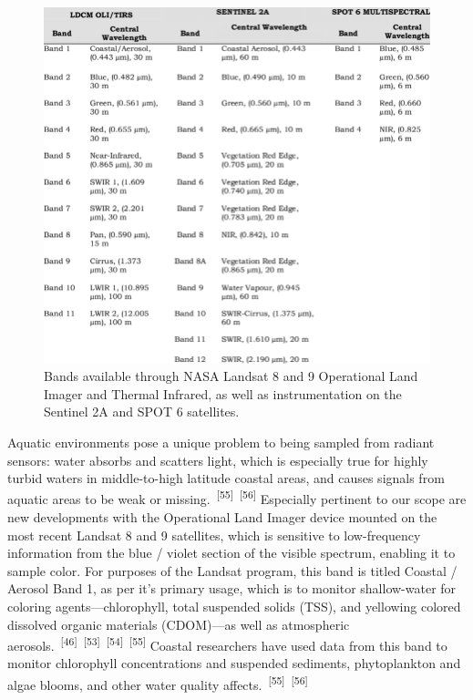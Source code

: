 \documentclass{article}
\begin{document}

\begin{figure}
    \centering
    \includegraphics[width=0.7\linewidth]{images/landsat-8-specs.png}
    \caption{Bands available through NASA Landsat 8 and 9 Operational Land Imager and Thermal Infrared, as well as instrumentation on the Sentinel 2A and SPOT 6 satellites.}
    \label{figure13}
\end{figure}


\par{Aquatic environments pose a unique problem to being sampled from radiant sensors: water absorbs and scatters light, which is especially true for highly turbid waters in middle-to-high latitude coastal areas, and causes signals from aquatic areas to be weak or missing.~\textsuperscript{[55]}~\textsuperscript{[56]} Especially pertinent to our scope are new developments with the Operational Land Imager device mounted on the most recent Landsat 8 and 9 satellites, which is sensitive to low-frequency information from the blue / violet section of the visible spectrum, enabling it to sample color. For purposes of the Landsat program, this band is titled Coastal / Aerosol Band 1, as per it's primary usage, which is to monitor shallow-water for coloring agents---chlorophyll, total suspended solids (TSS), and yellowing colored dissolved organic materials (CDOM)---as well as atmospheric aerosols.~\textsuperscript{[46]}~\textsuperscript{[53]}~\textsuperscript{[54]}~\textsuperscript{[55]} Coastal researchers have used data from this band to monitor chlorophyll concentrations and suspended sediments, phytoplankton and algae blooms, and other water quality affects.~\textsuperscript{[55]}~\textsuperscript{[56]}}
\end{document}
